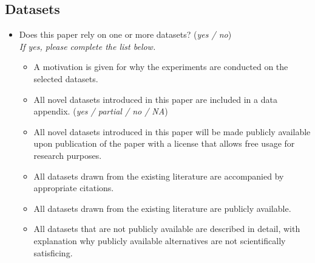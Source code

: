 \documentclass[letterpaper]{article} %
\begin{document}
\subsection*{Datasets}
\begin{itemize}
    \item Does this paper rely on one or more datasets? \hfill (\textit{yes / no}) \\
    \textit{If yes, please complete the list below.}
    \begin{itemize}
        \item A motivation is given for why the experiments are conducted on the selected datasets. \\ 
        \item All novel datasets introduced in this paper are included in a data appendix. \hfill (\textit{yes / partial / no / NA})
        \item All novel datasets introduced in this paper will be made publicly available upon publication of the paper with a license that allows free usage for research purposes. \\ 
        \item All datasets drawn from the existing literature are accompanied by appropriate citations. \\ 
        \item All datasets drawn from the existing literature are publicly available. \\ 
        \item All datasets that are not publicly available are described in detail, with explanation why publicly available alternatives are not scientifically satisficing. \\ 
    \end{itemize}
\end{itemize}
\end{document}
